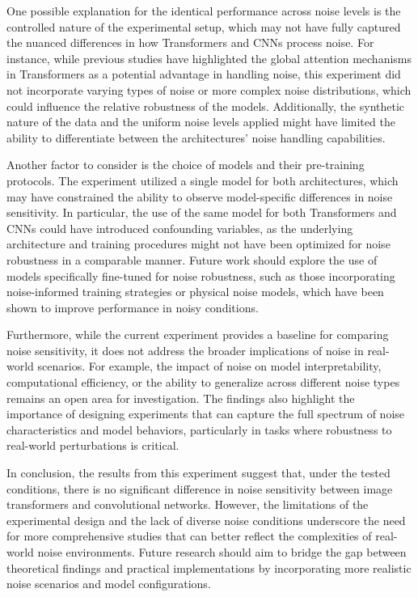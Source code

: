 \documentclass{article}
\begin{document}
One possible explanation for the identical performance across noise levels is the controlled nature of the experimental setup, which may not have fully captured the nuanced differences in how Transformers and CNNs process noise. For instance, while previous studies have highlighted the global attention mechanisms in Transformers as a potential advantage in handling noise, this experiment did not incorporate varying types of noise or more complex noise distributions, which could influence the relative robustness of the models. Additionally, the synthetic nature of the data and the uniform noise levels applied might have limited the ability to differentiate between the architectures' noise handling capabilities.

Another factor to consider is the choice of models and their pre-training protocols. The experiment utilized a single model for both architectures, which may have constrained the ability to observe model-specific differences in noise sensitivity. In particular, the use of the same model for both Transformers and CNNs could have introduced confounding variables, as the underlying architecture and training procedures might not have been optimized for noise robustness in a comparable manner. Future work should explore the use of models specifically fine-tuned for noise robustness, such as those incorporating noise-informed training strategies or physical noise models, which have been shown to improve performance in noisy conditions.

Furthermore, while the current experiment provides a baseline for comparing noise sensitivity, it does not address the broader implications of noise in real-world scenarios. For example, the impact of noise on model interpretability, computational efficiency, or the ability to generalize across different noise types remains an open area for investigation. The findings also highlight the importance of designing experiments that can capture the full spectrum of noise characteristics and model behaviors, particularly in tasks where robustness to real-world perturbations is critical.

In conclusion, the results from this experiment suggest that, under the tested conditions, there is no significant difference in noise sensitivity between image transformers and convolutional networks. However, the limitations of the experimental design and the lack of diverse noise conditions underscore the need for more comprehensive studies that can better reflect the complexities of real-world noise environments. Future research should aim to bridge the gap between theoretical findings and practical implementations by incorporating more realistic noise scenarios and model configurations.
\end{document}
